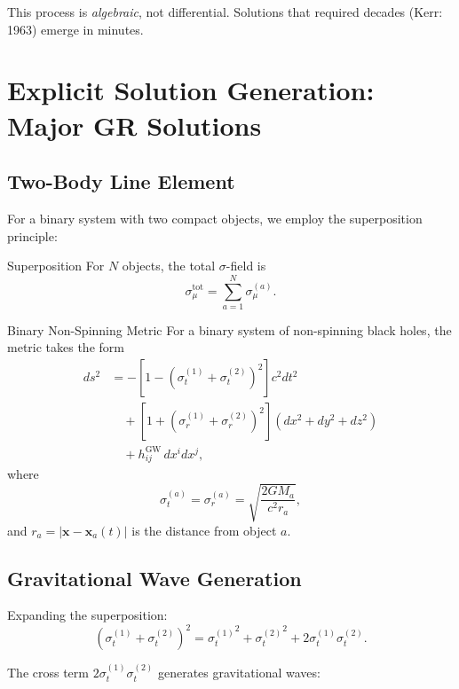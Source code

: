 \documentclass[11pt,a4paper]{article}
\theoremstyle{definition}
\theoremstyle{remark}
\begin{document}
	This process is \emph{algebraic}, not differential. Solutions that required decades (Kerr: 1963) emerge in minutes.
	
	\section{Explicit Solution Generation: Major GR Solutions}
	
	\subsection{Two-Body Line Element}
	
	For a binary system with two compact objects, we employ the superposition principle:
	
	Superposition
		For $N$ objects, the total $\sigma$-field is
		\begin{equation}
			\sigma_\mu^{\text{tot}} = \sum_{a=1}^N \sigma_\mu^{(a)}.
		\end{equation}
	
	Binary Non-Spinning Metric
		For a binary system of non-spinning black holes, the metric takes the form
		\begin{equation}
			\boxed{
				\begin{aligned}
					ds^2 &= -\left[1 - \left(\sigma_t^{(1)} + \sigma_t^{(2)}\right)^2\right] c^2 dt^2\\
					&\quad + \left[1 + \left(\sigma_r^{(1)} + \sigma_r^{(2)}\right)^2\right](dx^2 + dy^2 + dz^2)\\
					&\quad + h_{ij}^{\text{GW}} \, dx^i dx^j,
				\end{aligned}
			}
		\end{equation}
		where
		\begin{equation}
			\sigma_t^{(a)} = \sigma_r^{(a)} = \sqrt{\frac{2GM_a}{c^2 r_a}},
		\end{equation}
		and $r_a = |\mathbf{x} - \mathbf{x}_a(t)|$ is the distance from object $a$.
	
	\subsection{Gravitational Wave Generation}
	
	Expanding the superposition:
	\begin{equation}
		(\sigma_t^{(1)} + \sigma_t^{(2)})^2 = {\sigma_t^{(1)}}^2 + {\sigma_t^{(2)}}^2 + 2\sigma_t^{(1)}\sigma_t^{(2)}.
	\end{equation}
	
	The cross term $2\sigma_t^{(1)}\sigma_t^{(2)}$ generates gravitational waves:
	
\end{document}
